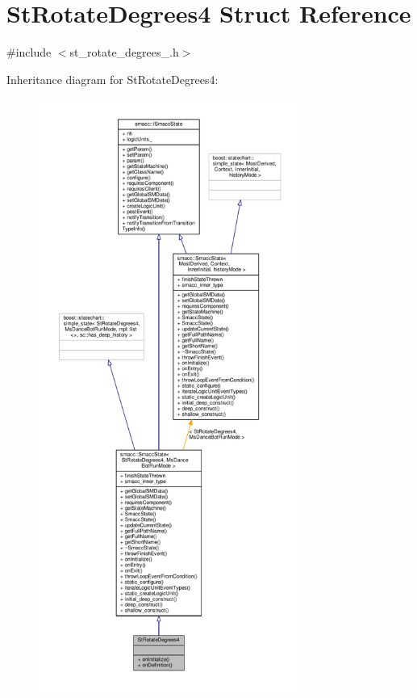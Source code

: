 \hypertarget{structStRotateDegrees4}{}\section{St\+Rotate\+Degrees4 Struct Reference}
\label{structStRotateDegrees4}


{\ttfamily \#include $<$st\+\_\+rotate\+\_\+degrees\+\_.\+h$>$}



Inheritance diagram for St\+Rotate\+Degrees4\+:
\nopagebreak
\begin{figure}[H]
\begin{center}
\leavevmode
\includegraphics[height=550pt]{structStRotateDegrees4__inherit__graph}
\end{center}
\end{figure}


